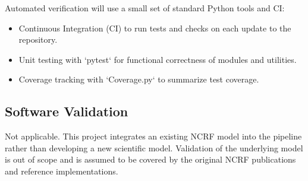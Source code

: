 \documentclass[12pt, titlepage]{article}
\begin{document}


Automated verification will use a small set of standard Python tools and CI:
\begin{itemize}
  \item Continuous Integration (CI) to run tests and checks on each update to the repository.
  \item Unit testing with `pytest` for functional correctness of modules and utilities.
  \item Coverage tracking with `Coverage.py` to summarize test coverage.
\end{itemize}

\subsection{Software Validation}
Not applicable. This project integrates an existing NCRF model into the pipeline rather than developing a new scientific model. Validation of the underlying model is out of scope and is assumed to be covered by the original NCRF publications and reference implementations.



\end{document}
